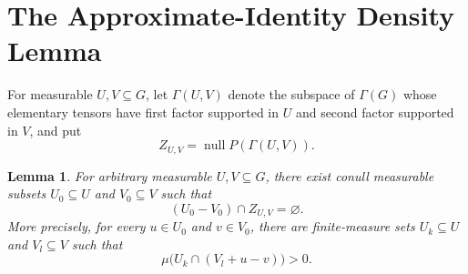 \documentclass[11pt]{article}
\newtheorem{lemma}{Lemma}
\newcommand{\nul}{\operatorname{null}}
\begin{document}
\section*{The Approximate-Identity Density Lemma}

For measurable \(U,V\subseteq G\), let \(\Gamma(U,V)\) denote the subspace
of \(\Gamma(G)\) whose elementary tensors have first factor supported in
\(U\) and second factor supported in \(V\), and put
\[
                  Z_{U,V}=\nul P(\Gamma(U,V)).
\]

\begin{lemma}\label{lem:density}
For arbitrary measurable \(U,V\subseteq G\), there exist conull measurable
subsets \(U_0\subseteq U\) and \(V_0\subseteq V\) such that
\[
                       (U_0-V_0)\cap Z_{U,V}=\varnothing.
\]
More precisely, for every \(u\in U_0\) and \(v\in V_0\), there are
finite-measure sets \(U_k\subseteq U\) and \(V_l\subseteq V\) such that
\[
                  \mu\bigl(U_k\cap(V_l+u-v)\bigr)>0.
\]
\end{lemma}
\end{document}
